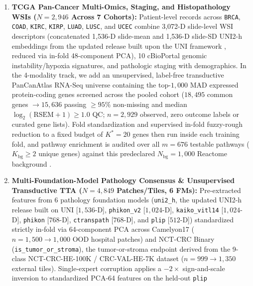 \documentclass[10pt,twocolumn]{article}
\begin{document}
\begin{enumerate}[leftmargin=1.4em,itemsep=1pt,topsep=2pt]
    \item \textbf{TCGA Pan-Cancer Multi-Omics, Staging, and Histopathology WSIs ($N=2,946$
    Across 7 Cohorts):} Patient-level records across \texttt{BRCA}, \texttt{COAD},
    \texttt{KIRC}, \texttt{KIRP}, \texttt{LUAD}, \texttt{LUSC}, and \texttt{UCEC} combine
    3,072-D slide-level WSI descriptors (concatenated 1,536-D slide-mean and 1,536-D slide-SD
    UNI2-h embeddings from the updated release built upon the UNI framework
    \cite{chen2024uni,mahmoodlab2025uni2h},
    reduced via in-fold 48-component PCA), 10 cBioPortal
    \cite{cerami2012cbioportal} genomic instability/hypoxia signatures, and pathologic staging
    with demographics. In the 4-modality track, we add an unsupervised, label-free transductive
    PanCanAtlas RNA-Seq universe containing the top-$1,000$ MAD expressed protein-coding genes
    screened across the pooled cohort ($18,495$ common genes $\to 15,636$ passing $\ge 95\%$
    non-missing and median $\log_2(\text{RSEM}+1)\ge 1.0$ QC; $n=2,929$ observed, zero outcome
    labels or curated gene lists). Fold standardization and supervised in-fold fuzzy-rough
    reduction to a fixed budget of $K^*=20$ genes then run inside each training fold, and
    pathway enrichment is audited over all $m=676$ testable pathways ($K_{\text{bg}} \ge 2$
    unique genes) against this predeclared $N_{\text{bg}}=1,000$ Reactome background
    \cite{milacic2024reactome}.
    \item \textbf{Multi-Foundation-Model Pathology Consensus \& Unsupervised Transductive TTA
    ($N=4,849$ Patches/Tiles, 6 FMs):} Pre-extracted features from 6 pathology foundation
    models (\texttt{uni2\_h}, the updated UNI2-h release built on UNI
    \cite{chen2024uni,mahmoodlab2025uni2h}
    [$1,536$-D], \texttt{phikon\_v2}
    \cite{filiot2024phikonv2} [$1,024$-D], \texttt{kaiko\_\allowbreak vitl14}
    \cite{kaiko2024towards} [$1,024$-D], \texttt{phikon} \cite{filiot2023scaling} [$768$-D],
    \texttt{ctranspath} \cite{wang2022transformer} [$768$-D], and \texttt{plip}
    \cite{huang2023visual} [$512$-D]) standardized strictly in-fold via 64-component PCA across
    Camelyon17 \cite{bandi2018detection} ($n=1,500 \to 1,000$ OOD hospital patches) and
    NCT-CRC Binary (\texttt{is\_tumor\_or\_stroma}), the tumor-or-stroma endpoint derived
    from the 9-class NCT-CRC-HE-100K / CRC-VAL-HE-7K dataset \cite{kather2019predicting}
    ($n=999 \to 1,350$ external tiles). Single-expert corruption applies a $-2\times$
    sign-and-scale inversion to standardized PCA-64 features on the held-out \texttt{plip}

\end{enumerate}
\end{document}
